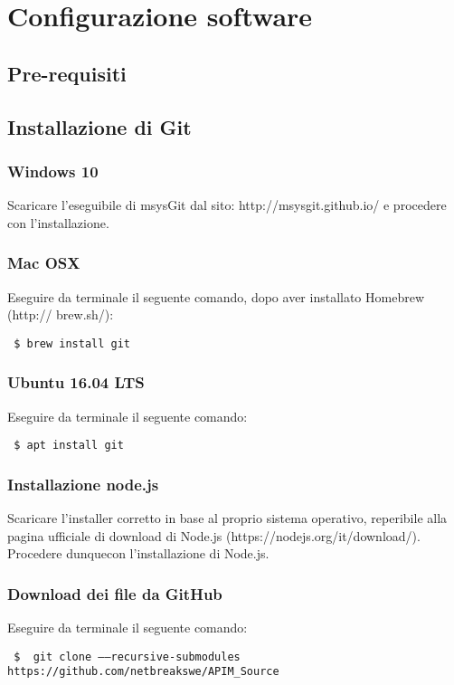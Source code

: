 \newpage
\section{Configurazione software}
\subsection{Pre-requisiti}

\subsection{Installazione di Git}
	\subsubsection{Windows 10}
	Scaricare l’eseguibile di msysGit dal sito: http://msysgit.github.io/ e procedere con
	l’installazione.
	\subsubsection{Mac OSX}
	Eseguire da terminale il seguente comando, dopo aver installato Homebrew (http://
	brew.sh/):
	
	\begin{center}
	  \verb| $ brew install git|
	\end{center}

	\subsubsection{Ubuntu 16.04 LTS}
	Eseguire da terminale il seguente comando:
	
	\begin{center}
	  \verb| $ apt install git|
\end{center}

\subsubsection{Installazione node.js}
Scaricare l'installer corretto in base al proprio sistema operativo, reperibile alla pagina ufficiale di download di Node.js (https://nodejs.org/it/download/). Procedere dunquecon l’installazione di Node.js.

\subsubsection{Download dei file da GitHub}
Eseguire da terminale il seguente comando:
\begin{center}
	\verb| $  git clone ––recursive-submodules https://github.com/netbreakswe/APIM_Source|
\end{center}


